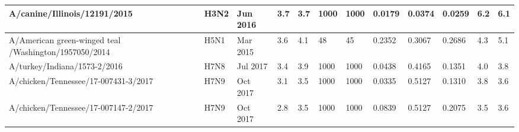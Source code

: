 \begin{tabular}{L{1.32in}|L{.35in}|L{.3in}|L{.3in}|L{.3in}|L{.35in}|L{.35in}|L{.35in}|L{.35in}|L{.32in}|L{.3in}|L{.3in}}
 A/canine/Illinois/12191/2015 &H3N2& Jun  2016 &3.7&3.7&1000&1000&0.0179&0.0374&0.0259&6.2&6.1\\\hline
 A/American  green-winged  teal /Washington/1957050/2014 &H5N1& Mar  2015 &3.6&4.1&48&45&0.2352&0.3067&0.2686&4.3&5.1\\\hline
 A/turkey/Indiana/1573-2/2016 &H7N8& Jul  2017 &3.4&3.9&1000&1000&0.0438&0.4165&0.1351&4.0&3.8\\\hline
 A/chicken/Tennessee/17-007431-3/2017 &H7N9& Oct  2017 &3.1&3.5&1000&1000&0.0335&0.5127&0.1310&3.8&3.6\\\hline
 A/chicken/Tennessee/17-007147-2/2017 &H7N9& Oct  2017 &2.8&3.5&1000&1000&0.0839&0.5127&0.2075&3.5&3.6\\\hline
\end{tabular}